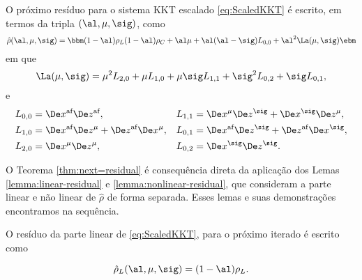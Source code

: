 \begin{teo}
\label{thm:next=residual}
O próximo resíduo para o sistema KKT escalado  \eqref{eq:ScaledKKT} é escrito, em
termos da tripla $(\al,\mu,\sig)$, como 
\begin{equation}
\label{eq:next-residual-all}
\nextrho(\al,\mu,\sig) = \bbm (1-\al)\rho_L \\   (1-\al)\rho_C+ \al\mu + \al(\al-\sig)L_{0,0} +  
\al^2 \La(\mu,\sig) \ebm
\end{equation}
em que 
\begin{equation}
\label{eq:Lambda-mu-sigma}
\La(\mu,\sig) =  \mu^2
 L_{2,0} + \mu L_{1,0} + \mu \sig L_{1,1} + \sig^2L_{0,2} + \sig
 L_{0,1},
\end{equation}
e
\begin{equation}
\label{eq:defining-Lij}
\begin{aligned}
	L_{0,0} & = \dex\dez, & L_{1,1}  & = \Dex^\mu\Dez^\sig +
			\Dex^\sig\Dez^\mu, \\	
	L_{1,0} &  = \dex\Dez^\mu +
			\dez\Dex^\mu,  & L_{0,1}  & = \dex\Dez^\sig + \dez\Dex^\sig, \\	
	L_{2,0} &  = \Dex^\mu\Dez^\mu,  & L_{0,2}  & = \Dex^\sig\Dez^\sig .\\	
\end{aligned}
\end{equation}

\end{teo}

O Teorema \ref{thm:next=residual} é consequência direta da aplicação
dos Lemas \ref{lemma:linear-residual} e \ref{lemma:nonlinear-residual}, que
consideram a parte linear e não linear de  $\hat{\rho}$ de forma separada. Esses lemas
e suas demonstrações encontramos na sequência. %
 
\begin{lema}\label{lemma:linear-residual}
O resíduo da parte linear de  \eqref{eq:ScaledKKT}, para o próximo iterado é
escrito como

\[
\hat{\rho}_L(\al,\mu,\sig) = (1-\al)\rho_L.
\]
 
\end{lema}

